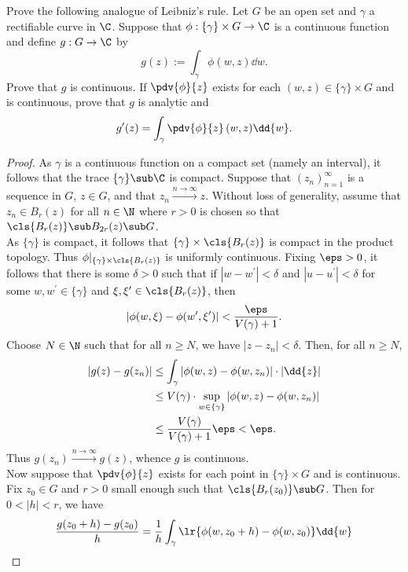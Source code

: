 \documentclass[12pt]{article}
\begin{document}
\begin{homeworkProblem}
  Prove the following analogue of Leibniz's rule. Let $ G $ be an open set and $ \gamma $ a rectifiable curve in $ \C $. Suppose that $ \phi:\{\gamma\}\times G \to \C $ is a continuous function and define $ g:G\to \C $ by
  \[
    g(z):= \int_{\gamma} \phi(w,z) \dd{w}.
  \]
  Prove that $ g $ is continuous. If $ \pdv{\phi}{z}  $ exists for each $ (w,z) \in \{\gamma\} \times G$  and is continuous, prove that $ g $ is analytic and 
  \[
    g^{\prime}(z) = \int_{\gamma}\pdv{\phi}{z}\, (w,z)\dd{w}.
  \]

  \begin{proof}
    As $ \gamma $ is a continuous function on a compact set (namely an interval), it follows that the trace $ \{\gamma\}\sub \C $ is compact. Suppose that $ (z_{n})_{n=1}^{\infty} $ is a sequence in $ G $, $ z\in G $, and that $ z_{n}\xrightarrow{n\to\infty}z $. Without loss of generality, assume that $ z_{n}\in B_{r}(z) $ for all $ n\in \N $ where $ r>0 $ is chosen so that $ \cls{B_{r}(z)}\sub B_{2r}(z)\sub G $.\\ 

    As $ \{\gamma\} $ is compact, it follows that $ \{\gamma\}\times \cls{B_{r}(z)} $ is compact in the product topology. Thus $ \phi\vert_{\{\gamma\}\times \cls{B_{r}(z)}} $ is uniformly continuous. Fixing $ \eps>0 $, it follows that there is some $ \delta>0 $ such that if $ |w-w^{\prime}|<\delta $ and $ |u-u^{\prime}|<\delta $ for some $ w,w^{\prime}\in \{\gamma\} $ and $ \xi,\xi^{\prime}\in \cls{B_{r}(z)}$, then 
    \[
      |\phi(w,\xi) - \phi(w^{\prime},\xi^{\prime})|< \frac{\eps}{V(\gamma)+1}.
    \]
    Choose $ N\in \N $ such that for all $ n\geq N $, we have $ |z-z_{n}| < \delta $. Then, for all $ n\geq N $,
    \begin{align*}
      |g(z)-g(z_{n})| &\leq \int_{\gamma} | \phi(w,z) - \phi(w,z_{n})|\cdot |\dd{z}| \\
      &\leq V(\gamma)\cdot \sup_{w\in \{\gamma\}} | \phi(w,z) - \phi(w,z_{n})|\\
      &\leq \frac{V(\gamma)}{V(\gamma)+1} \eps < \eps.
    \end{align*}
    Thus $ g(z_{n})\xrightarrow{n\to\infty} g(z) $, whence $ g $ is continuous.\\

    Now suppose that $ \pdv{\phi}{z}  $ exists for each point in $ \{\gamma\}\times G $  and is continuous. Fix $ z_{0}\in G $ and $ r>0 $ small enough such that $ \cls{B_{r}(z_{0})}\sub G $. Then for $ 0<|h|<r $, we have 
    \begin{align*}
      \frac{g(z_{0}+h) - g(z_{0})}{h} = \frac{1}{h}\int_{\gamma}  \lr{\phi(w,z_{0}+h) - \phi(w,z_{0})} \dd{w}
    \end{align*}


\end{proof}
\end{homeworkProblem}
\end{document}
